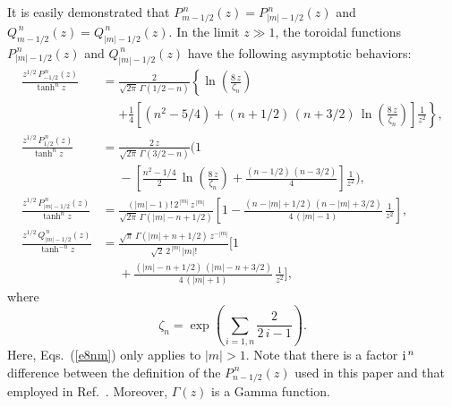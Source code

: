 \documentclass[12pt,prb,aps]{revtex4-1}
\begin{document}
It is easily demonstrated that $P_{m-1/2}^{\,n}(z)= P_{|m|-1/2}^{\,n}(z)$
and $Q_{m-1/2}^{\,n}(z) = Q_{|m|-1/2}^{\,n}(z)$.\cite{abram2}
In the limit $z\gg 1$, the toroidal functions $P_{|m|-1/2}^{\,n}(z)$ and $Q_{|m|-1/2}^{\,n}(z)$
have the following asymptotic behaviors:\,\cite{morse2,bate}
\begin{align}
\frac{z^{1/2}\,P_{-1/2}^{\,n}(z)}{\tanh^{n}z}&= \frac{2}{\sqrt{2\pi}\,\Gamma(1/2-n)}
\left\{\ln\left(\frac{8\,z}{\zeta_n}\right)\right.\nonumber\\[0.5ex]
&\phantom{=}\left.
+ \frac{1}{4}\left[(n^2-5/4)+ (n+1/2)\,(n+3/2)\,\ln\left(\frac{8\,z}{\zeta_n}\right)\right]\frac{1}{z^2}\right\},\\[0.5ex]
\frac{z^{1/2}\,P_{1/2}^{\,n}(z)}{\tanh^n z}&= \frac{2\,z}{\sqrt{2\pi}\,\Gamma(3/2-n)}
\Biggl(1\nonumber\\[0.5ex]&\phantom{=}-\left[\frac{n^2-1/4}{2}\,\ln\left(\frac{8\,z}{\zeta_n}\right)+\frac{(n-1/2)\,(n-3/2)}{4} \right]\frac{1}{z^2}\Biggr),\\[0.5ex]
\frac{z^{1/2}\,P_{|m|-1/2}^{\,n}(z)}{\tanh^n z}&= \frac{(|m|-1)!\,2^{\,|m|}\,z^{\,|m|}}{\sqrt{2\pi}\,\Gamma(|m|-n+1/2)}
\left[1- \frac{(n-|m|+1/2)\,(n-|m|+3/2)}{4\,(|m|-1)}\,\frac{1}{z^2}\right],\label{e8nm}\\[0.5ex]
\frac{z^{1/2}\,Q_{|m|-1/2}^{\,n}(z)}{\tanh^{-n}z}&=  \frac{\sqrt{\pi}\,\Gamma(|m|+n+1/2)\,z^{-|m|}}{\sqrt{2}\,2^{\,|m|}\,|m|!}
\Biggl[1\nonumber\\[0.5ex]&\phantom{=}+ \frac{(|m|-n+1/2)\,(|m|-n+3/2)}{4\,(|m|+1)}\,\frac{1}{z^2}\Biggr],\label{e241}
\end{align}
where
\begin{equation}
\zeta_n = \exp\left(\sum_{i=1,n}\frac{2}{2\,i-1}\right).
\end{equation}
Here, Eqs.~(\ref{e8nm}) only applies to $|m|>1$. 
Note that there is a factor ${\rm i}^{\,n}$ difference between the definition of the $P_{n-1/2}^{\,n}(z)$ used in this paper and that employed in Ref.~.
Moreover, $\Gamma(z)$ is a Gamma function.\cite{abram1} 
\end{document}
